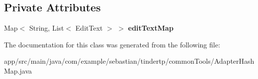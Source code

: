 \subsection*{Private Attributes}
\begin{DoxyCompactItemize}
\item 
Map$<$ String, List$<$ Edit\+Text $>$ $>$ {\bfseries edit\+Text\+Map}\hypertarget{classcom_1_1example_1_1sebastian_1_1tindertp_1_1commonTools_1_1AdapterHashMap_a5e743c780102dd4d088caffdd77dfdef}{}\label{classcom_1_1example_1_1sebastian_1_1tindertp_1_1commonTools_1_1AdapterHashMap_a5e743c780102dd4d088caffdd77dfdef}

\end{DoxyCompactItemize}


The documentation for this class was generated from the following file\+:\begin{DoxyCompactItemize}
\item 
app/src/main/java/com/example/sebastian/tindertp/common\+Tools/Adapter\+Hash\+Map.\+java\end{DoxyCompactItemize}
